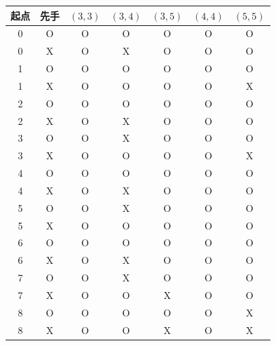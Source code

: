 \begin{tabular}{ccccccc}
\toprule
起点 & 先手 & $(3,3)$ & $(3,4)$ & $(3,5)$ & $(4,4)$ & $(5,5)$ \\
\midrule
0 & O & O & O & O & O & O \\
0 & X & O & X & O & O & O \\
1 & O & O & O & O & O & O \\
1 & X & O & O & O & O & X \\
2 & O & O & O & O & O & O \\
2 & X & O & X & O & O & O \\
3 & O & O & X & O & O & O \\
3 & X & O & O & O & O & X \\
4 & O & O & O & O & O & O \\
4 & X & O & X & O & O & O \\
5 & O & O & X & O & O & O \\
5 & X & O & O & O & O & O \\
6 & O & O & O & O & O & O \\
6 & X & O & X & O & O & O \\
7 & O & O & X & O & O & O \\
7 & X & O & O & X & O & O \\
8 & O & O & O & O & O & X \\
8 & X & O & O & X & O & X \\
\bottomrule
\end{tabular}
